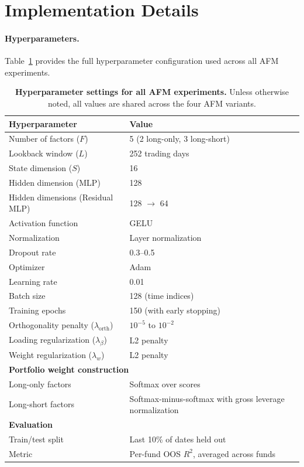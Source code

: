 
\section{Implementation Details}\label{app:implementation}

\paragraph{Hyperparameters.}
Table~\ref{tab:hyperparams} provides the full hyperparameter configuration used across all AFM experiments.

\begin{table}[h]
\centering
\caption{\textbf{Hyperparameter settings for all AFM experiments.} Unless otherwise noted, all values are shared across the four AFM variants.}
\label{tab:hyperparams}
\small
\begin{tabular}{ll}
\toprule
\textbf{Hyperparameter} & \textbf{Value} \\
\midrule
Number of factors ($F$) & 5 (2 long-only, 3 long-short) \\
Lookback window ($L$) & 252 trading days \\
State dimension ($S$) & 16 \\
Hidden dimension (MLP) & 128 \\
Hidden dimensions (Residual MLP) & 128 $\to$ 64 \\
Activation function & GELU \\
Normalization & Layer normalization \\
Dropout rate & 0.3--0.5 \\
Optimizer & Adam \\
Learning rate & 0.01 \\
Batch size & 128 (time indices) \\
Training epochs & 150 (with early stopping) \\
Orthogonality penalty ($\lambda_{\text{orth}}$) & $10^{-5}$ to $10^{-2}$ \\
Loading regularization ($\lambda_\beta$) & L2 penalty \\
Weight regularization ($\lambda_w$) & L2 penalty \\
\midrule
\multicolumn{2}{l}{\textbf{Portfolio weight construction}} \\
Long-only factors & Softmax over scores \\
Long-short factors & Softmax-minus-softmax with gross leverage normalization \\
\midrule
\multicolumn{2}{l}{\textbf{Evaluation}} \\
Train/test split & Last 10\% of dates held out \\
Metric & Per-fund OOS $R^2$, averaged across funds \\
\bottomrule
\end{tabular}
\end{table}

